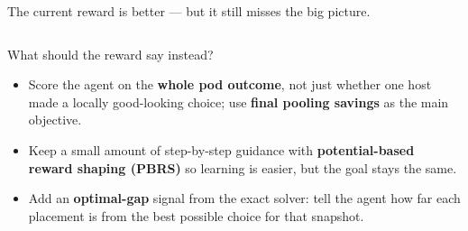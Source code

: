 \documentclass[11pt,aspectratio=43]{beamer}
\begin{document}
\begin{frame}[shrink=6]{The current reward is better --- but it still misses the big picture.}
\begin{columns}[T,onlytextwidth]
\begin{center}
      \end{center}
  \end{columns}

\end{frame}


\begin{frame}{What should the reward say instead?}

  \vspace{0.5em}

  \begin{itemize}
    \setlength{\itemsep}{1.1em}
    \item Score the agent on the \textbf{whole pod outcome}, not just whether one
          host made a locally good-looking choice; use \textbf{final pooling savings}
          as the main objective.
    \item Keep a small amount of step-by-step guidance with
          \textbf{potential-based reward shaping (PBRS)} so learning is easier,
          but the goal stays the same.
    \item Add an \textbf{optimal-gap} signal from the exact solver:
          tell the agent how far each placement is from the best possible choice
          for that snapshot.
  \end{itemize}

\end{frame}

\end{document}
